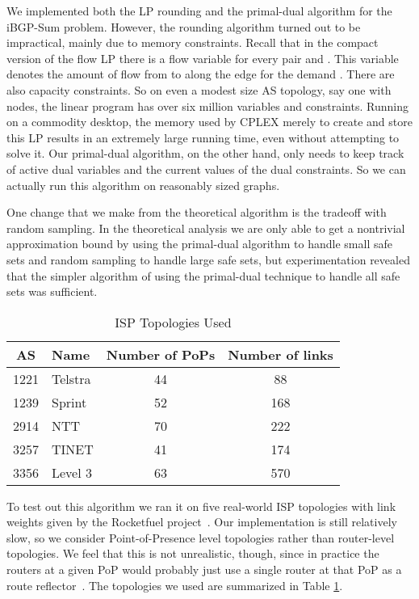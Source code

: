 \documentclass[11pt,letterpaper]{article}
\theoremstyle{definition}
\newcounter{note}[section]
\begin{document}
We implemented both the LP rounding and the primal-dual algorithm for
the {\sc iBGP-Sum} problem.  However, the rounding algorithm turned
out to be impractical, mainly due to memory constraints.  Recall that
in the compact version of the flow LP there is a flow variable
 for every pair  and .  This variable
denotes the amount of flow from  to  along the edge  for
the demand .  There are also  capacity
constraints.  So on even a modest size AS topology, say one with 
nodes, the linear program has over six million variables and
constraints.  Running on a commodity desktop, the memory used by CPLEX
merely to create and store this LP results in an extremely large
running time, even without attempting to solve it.  Our primal-dual
algorithm, on the other hand, only needs to keep track of 
active dual variables and the current values of the  dual
constraints.  So we can actually run this algorithm on reasonably
sized graphs.

One change that we make from the theoretical algorithm is the tradeoff
with random sampling.  In the theoretical analysis we are only able to
get a nontrivial approximation bound by using the primal-dual
algorithm to handle small safe sets and random sampling to handle
large safe sets, but experimentation revealed that the simpler
algorithm of using the primal-dual technique to handle all safe sets
was sufficient.

\begin{table}
\begin{center}
\begin{tabular}{|c|l|c|c|}
\hline
AS & Name & Number of PoPs & Number of links\\
\hline
1221 & Telstra & 44 & 88 \\
1239 & Sprint & 52 & 168 \\
2914 & NTT & 70 & 222 \\
3257 & TINET & 41 & 174 \\
3356 & Level 3 & 63 & 570 \\
\hline
\end{tabular}
\end{center}
\caption{ISP Topologies Used}
\label{tab:topologies}
\end{table}

To test out this algorithm we ran it on five real-world ISP topologies
with link weights given by the Rocketfuel project~\cite{Rocketfuel04}.
Our implementation is still relatively slow, so we consider
Point-of-Presence level topologies rather than router-level
topologies.  We feel that this is not unrealistic, though, since in
practice the routers at a given PoP would probably just use a single
router at that PoP as a route reflector~\cite[Section
3.1]{POAMZ10}. The topologies we used are summarized in Table
\ref{tab:topologies}.
\end{document}
